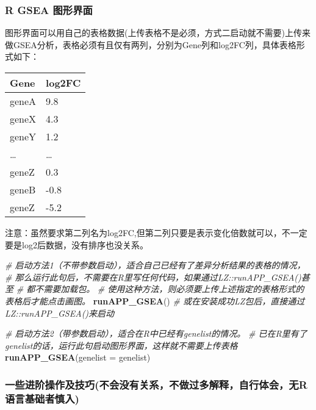 \documentclass[
]{book}
\newenvironment{Shaded}{\begin{snugshade}}{\end{snugshade}}
\newcommand{\AttributeTok}[1]{\textcolor[rgb]{0.13,0.29,0.53}{#1}}
\newcommand{\CommentTok}[1]{\textcolor[rgb]{0.56,0.35,0.01}{\textit{#1}}}
\newcommand{\FunctionTok}[1]{\textcolor[rgb]{0.13,0.29,0.53}{\textbf{#1}}}
\newcommand{\NormalTok}[1]{#1}
\begin{document}
\subsubsection{R GSEA 图形界面}\label{enrich-gsea-r.gsea.gui}

图形界面可以用自己的表格数据(上传表格不是必须，方式二启动就不需要)上传来做GSEA分析，表格必须有且仅有两列，分别为Gene列和log2FC列，具体表格形式如下：

\begin{longtable}[]{@{}ll@{}}
\toprule\noalign{}
Gene & log2FC \\
\midrule\noalign{}
\endhead
\bottomrule\noalign{}
\endlastfoot
geneA & 9.8 \\
geneX & 4.3 \\
geneY & 1.2 \\
\ldots{} & \ldots{} \\
geneZ & 0.3 \\
geneB & -0.8 \\
geneZ & -5.2 \\
\end{longtable}

注意：虽然要求第二列名为log2FC,但第二列只要是表示变化倍数就可以，不一定要是log2后数据，没有排序也没关系。

\begin{Shaded}
\begin{Highlighting}[]
\CommentTok{\# 启动方法1（不带参数启动），适合自己已经有了差异分析结果的表格的情况，}
\CommentTok{\#  那么运行此句后，不需要在R里写任何代码，如果通过LZ::runAPP\_GSEA()甚至}
\CommentTok{\#  都不需要加载包。}
\CommentTok{\#  使用这种方法，则必须要上传上述指定的表格形式的表格后才能点击画图。}
\FunctionTok{runAPP\_GSEA}\NormalTok{() }\CommentTok{\# 或在安装成功LZ包后，直接通过LZ::runAPP\_GSEA()来启动}

\CommentTok{\# 启动方法2（带参数启动），适合在R中已经有genelist的情况。}
\CommentTok{\# 已在R里有了genelist的话，运行此句启动图形界面，这样就不需要上传表格}
\FunctionTok{runAPP\_GSEA}\NormalTok{(}\AttributeTok{genelist =}\NormalTok{ genelist)}
\end{Highlighting}
\end{Shaded}

\subsubsection{一些进阶操作及技巧(不会没有关系，不做过多解释，自行体会，无R语言基础者慎入)}\label{ux4e00ux4e9bux8fdbux9636ux64cdux4f5cux53caux6280ux5de7ux4e0dux4f1aux6ca1ux6709ux5173ux7cfbux4e0dux505aux8fc7ux591aux89e3ux91caux81eaux884cux4f53ux4f1aux65e0rux8bedux8a00ux57faux7840ux8005ux614eux5165}
\end{document}
